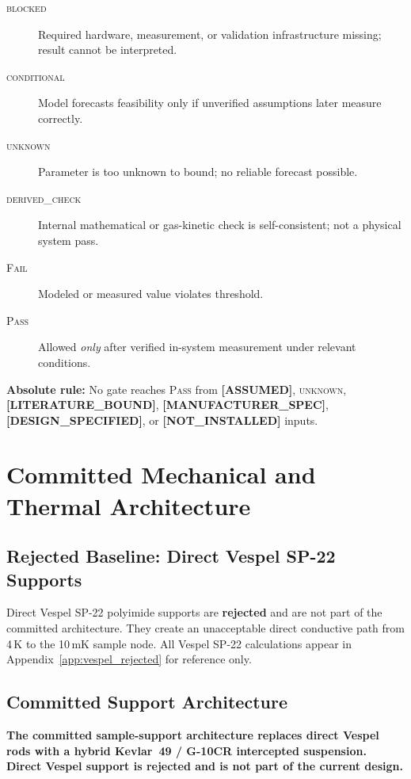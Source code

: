 \documentclass[12pt,a4paper]{article}
\newcommand{\blocked}{\textsc{blocked}}
\newcommand{\conditional}{\textsc{conditional}}
\newcommand{\derivedcheck}{\textsc{derived\_check}}
\newcommand{\unknown}{\textsc{unknown}}
\newcommand{\assumed}{\textbf{[ASSUMED]}}
\newcommand{\designspec}{\textbf{[DESIGN\_SPECIFIED]}}
\newcommand{\notinstalled}{\textbf{[NOT\_INSTALLED]}}
\newcommand{\mfrspec}{\textbf{[MANUFACTURER\_SPEC]}}
\newcommand{\litbound}{\textbf{[LITERATURE\_BOUND]}}
\begin{document}
\begin{description}
  \item[\blocked{}] Required hardware, measurement, or validation infrastructure missing; result cannot be interpreted.
  \item[\conditional{}] Model forecasts feasibility only if unverified assumptions later measure correctly.
  \item[\unknown{}] Parameter is too unknown to bound; no reliable forecast possible.
  \item[\derivedcheck{}] Internal mathematical or gas-kinetic check is self-consistent; not a physical system pass.
  \item[\textsc{Fail}] Modeled or measured value violates threshold.
  \item[\textsc{Pass}] Allowed \emph{only} after verified in-system measurement under relevant conditions.
\end{description}

\textbf{Absolute rule:} No gate reaches \textsc{Pass} from \assumed{},
\unknown{}, \litbound{}, \mfrspec{}, \designspec{}, or \notinstalled{} inputs.

\section{Committed Mechanical and Thermal Architecture}
\label{sec:support}

\subsection{Rejected Baseline: Direct Vespel SP-22 Supports}

Direct Vespel SP-22 polyimide supports are \textbf{rejected} and are not part
of the committed architecture.
They create an unacceptable direct conductive path from 4\,K to the 10\,mK
sample node.
All Vespel SP-22 calculations appear in Appendix~\ref{app:vespel_rejected}
for reference only.

\subsection{Committed Support Architecture}

\textbf{The committed sample-support architecture replaces direct Vespel rods
with a hybrid Kevlar~49 / G-10CR intercepted suspension.
Direct Vespel support is rejected and is not part of the current design.}
\end{document}
